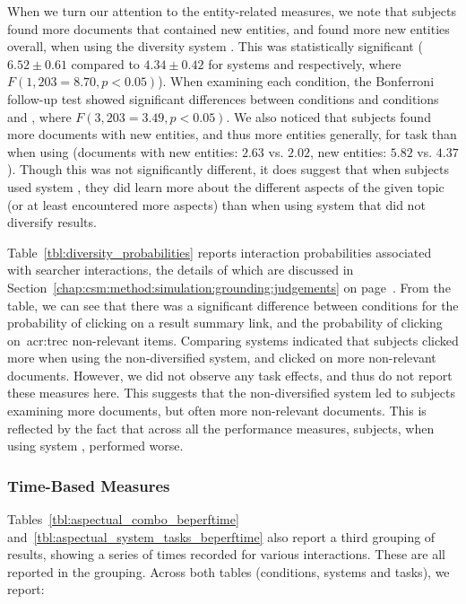 When we turn our attention to the entity-related measures, we note that subjects found more documents that contained new entities, and found more new entities overall, when using the diversity system . This was statistically significant ($6.52\pm0.61$ compared to $4.34\pm0.42$ for systems  and  respectively, where $F(1,203 = 8.70, p<0.05)$). When examining each condition, the Bonferroni follow-up test showed significant differences between conditions  and conditions  and , where $F(3,203 = 3.49, p < 0.05)$. We also noticed that subjects found more documents with new entities, and thus more entities generally, for task  than when using  (documents with new entities: $2.63$ vs. $2.02$, new entities: $5.82$ vs. $4.37$). Though this was not significantly different, it does suggest that when subjects used system , they did learn more about the different aspects of the given topic (or at least encountered more aspects) than when using system  that did not diversify results.

Table~\ref{tbl:diversity_probabilities} reports interaction probabilities associated with searcher interactions, the details of which are discussed in Section~\ref{chap:csm:method:simulation:grounding:judgements} on page~\pageref{chap:csm:method:simulation:grounding:judgements}. From the table, we can see that there was a significant difference between conditions for the probability of clicking on a result summary link, and the probability of clicking on~\gls{acr:trec} non-relevant items. Comparing systems indicated that subjects clicked more when using the non-diversified system, and clicked on more non-relevant documents. However, we did not observe any task effects, and thus do not report these measures here. This suggests that the non-diversified system  led to subjects examining more documents, but often more non-relevant documents. This is reflected by the fact that across all the performance measures, subjects, when using system , performed worse.

\subsubsection{Time-Based Measures}
Tables~\ref{tbl:aspectual_combo_beperftime} and~\ref{tbl:aspectual_system_tasks_beperftime} also report a third grouping of results, showing a series of times recorded for various interactions. These are all reported in the  grouping. Across both tables (conditions, systems and tasks), we report:


